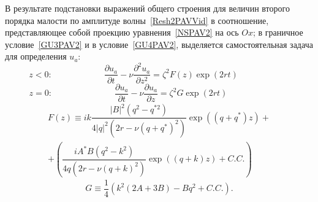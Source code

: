 В результате подстановки выражений общего строения для величин второго порядка малости по амплитуде волны~\eqref{Resh2PAVVid} в соотношение, представляющее собой проекцию уравнения~\eqref{NSPAV2} на ось $ Ox $; в граничное условие~\eqref{GU3PAV2} и в условие~\eqref{GU4PAV2}, выделяется самостоятельная задача для определения $ u_{a} $:
\begin{equation}
z<0:\mspace{108mu} \dfrac{\partial u_{a}}{\partial t}- \nu \dfrac{\partial^{2} u_{a}}{\partial z^{2}}=\zeta^{2}F\left( z \right) \exp \left( 2 r t \right) \mspace{108mu}
\label{UaPAV1}
\end{equation}
\begin{equation}
z=0:\mspace{130mu} \dfrac{\partial u_{a}}{\partial t}- \nu \dfrac{\partial u_{a}}{\partial z}=\zeta^{2}G \exp \left( 2 r t \right) \mspace{130mu}
\label{UaPAV2}
\end{equation}
\begin{multline*}
F\left( z \right) \equiv i k \dfrac{\vert B \vert^{2} \left( q^{2}-q^{*2}\right)}{4 \vert q \vert^{2} \left( 2 r-\nu \left( q + q^{*} \right)^{2}\right)} \exp \left( \left( q+q^{*}\right) z \right)+ \\
+\left( \dfrac{i A^{*} B \left( q^{2} - k^{2} \right)}{4 q \left( 2 r - \nu \left( q+k \right)^{2} \right)} \exp \left( \left( q+k\right) z \right) +C.C. \right)
\end{multline*}
\begin{equation*}
G \equiv \dfrac{1}{4}\left( k^{2} \left( 2 A + 3 B \right) - B q^{2} + C.C. \right).
\end{equation*}

